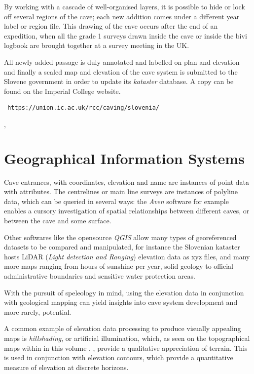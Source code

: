 By working with a cascade of well-organised layers, it is possible to hide or lock off several regions of the cave; each new addition comes under a different year label or region file. This drawing of the cave occurs after the end of an expedition, when all the grade 1 surveys drawn inside the cave or inside the bivi logbook are brought together at a survey meeting in the UK.

All newly added passage is duly annotated and labelled on plan and elevation and finally a scaled map and elevation of the cave system is submitted to the Slovene government in order to update its \emph{kataster} database. A copy can be found on the Imperial College website. \begin{verbatim} https://union.ic.ac.uk/rcc/caving/slovenia/  \end{verbatim},



\section{Geographical Information Systems}

Cave entrances, with coordinates, elevation and name are instances of point data with attributes. The centrelines or main line surveys are instances of polyline data, which can be queried in several ways: the \emph{Aven} software for example enables a cursory investigation of spatial relationships between different caves, or between the cave and some surface.

Other softwares like the opensource \emph{QGIS} allow many types of georeferenced datasets to be compared and manipulated, for instance the Slovenian kataster hosts LiDAR (\emph{Light detection and Ranging}) elevation data as xyz files, and many more maps ranging from hours of sunshine per year, solid geology to official administrative boundaries and sensitive water protection areas. 

With the pursuit of speleology in mind, using the elevation data in conjunction with geological mapping can yield insights into cave system development and more rarely, potential. 

A common example of elevation data processing to produce visually appealing maps is \emph{hillshading}, or artificial illumination, which, as seen on the topographical maps within in this volume , , provide a qualitative appreciation of terrain. This is used in conjunction with elevation contours, which provide a quantitative measure of elevation at discrete horizons. 

